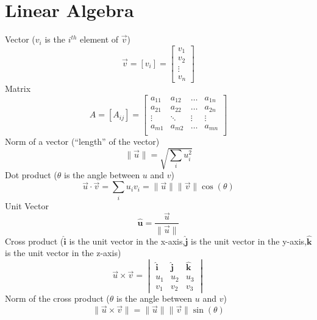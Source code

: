 \documentclass{article}
\newcommand{\uvec}[1]{\boldsymbol{\hat{\textbf{#1}}}}
\begin{document}
\section{Linear Algebra}
Vector ($v_i$ is the $i^{th}$ element of $\vec{v}$)
\begin{equation}
  \vec{v} = \left[v_i\right] = 
  \begin{bmatrix}
    v_1\\
    v_2\\
    \vdots\\
    v_n
  \end{bmatrix}
\end{equation}
Matrix
\begin{equation}
  A = \left[A_{ij}\right] = 
  \begin{bmatrix}
    a_{11} & a_{12} & \hdots & a_{1n}\\
    a_{21} & a_{22} & \hdots & a_{2n}\\
    \vdots & \ddots & \vdots & \vdots\\
    a_{m1} & a_{m2} & \hdots & a_{mn}\\
  \end{bmatrix}
\end{equation}
Norm of a vector (``length'' of the vector)
\begin{equation}
  \|\vec{u}\| = \sqrt{\sum_i u_i^2}
\end{equation}
Dot product ($\theta$ is the angle between $u$ and $v$)
\begin{equation}
  \vec{u} \cdot \vec{v} = \sum_i u_iv_i = \|\vec{u}\|\|\vec{v}\| \cos(\theta)
\end{equation}
Unit Vector
\begin{equation}
  \uvec{u} = \frac{\vec{u}}{\|\vec{u}\|}
\end{equation}
Cross product ($\uvec{i}$ is the unit vector in the x-axis,$\uvec{j}$ is the unit vector in the y-axis,$\uvec{k}$ is the unit vector in the z-axis)
\begin{equation}
  \vec{u} \times \vec{v} =
  \begin{vmatrix}
    \uvec{i} & \uvec{j} & \uvec{k}\\
    u_1 & u_2 & u_3\\
    v_1 & v_2 & v_3 
  \end{vmatrix}
\end{equation}
 Norm of the cross product ($\theta$ is the angle between $u$ and $v$)
\begin{equation}
  \|\vec{u} \times \vec{v}\| = \|\vec{u}\|\|\vec{v}\|\sin(\theta)
\end{equation}
\end{document}
